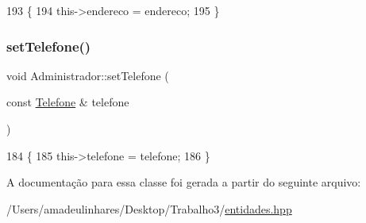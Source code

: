 \begin{DoxyCode}
193   \{
194     this->endereco = endereco;
195   \}
\end{DoxyCode}
\mbox{\label{class_administrador_ac841526561c3daf57f39ffd41e7211f2}} 
\subsubsection{\texorpdfstring{set\+Telefone()}{setTelefone()}}
{\footnotesize\ttfamily void Administrador\+::set\+Telefone (\begin{DoxyParamCaption}\item[{const \mbox{\hyperlink{class_telefone}{Telefone}} \&}]{telefone }\end{DoxyParamCaption})\hspace{0.3cm}{\ttfamily [inline]}}


\begin{DoxyCode}
184   \{
185     this->telefone = telefone;
186   \}
\end{DoxyCode}


A documentação para essa classe foi gerada a partir do seguinte arquivo\+:\begin{DoxyCompactItemize}
\item 
/\+Users/amadeulinhares/\+Desktop/\+Trabalho3/\mbox{\hyperlink{entidades_8hpp}{entidades.\+hpp}}\end{DoxyCompactItemize}
